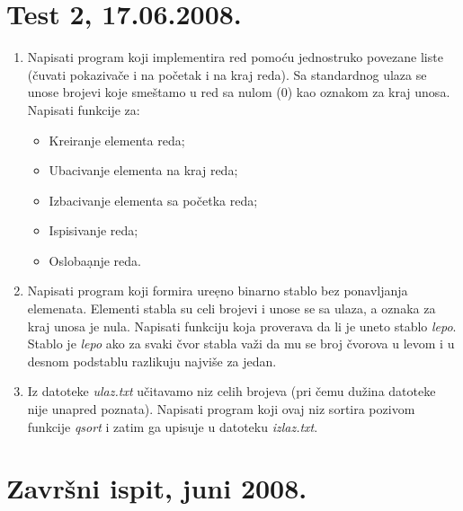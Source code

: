 \section{Test 2, 17.06.2008.}


\begin{enumerate}
\item
Napisati program koji implementira red pomo\' cu jednostruko
povezane liste (\v cuvati pokaziva\v ce i na po\v cetak i na kraj
reda).
Sa standardnog ulaza se unose brojevi koje sme\v stamo u red sa
nulom ($0$) kao oznakom za kraj unosa.
Napisati funkcije za:

\begin{itemize}
\item Kreiranje elementa reda;
\item Ubacivanje elementa na kraj reda;
\item Izbacivanje elementa sa po\v cetka reda;
\item Ispisivanje reda;
\item Osloba\d anje reda.
\end{itemize}


\item
Napisati program koji formira ure\d eno binarno stablo bez ponavljanja
elemenata. Elementi stabla su celi brojevi i unose se sa ulaza, a oznaka
za kraj unosa je nula. Napisati funkciju koja proverava da li je uneto
stablo \emph{lepo}. Stablo je \emph{lepo} ako za svaki \v cvor
stabla va\v zi da mu se broj \v cvorova u levom i u desnom podstablu
razlikuju najvi\v se za jedan.

\item
Iz datoteke \emph{ulaz.txt} u\v citavamo niz celih brojeva (pri \v cemu
du\v zina datoteke nije unapred poznata). Napisati program koji
ovaj niz sortira pozivom funkcije \emph{qsort} i zatim ga
upisuje u datoteku \emph{izlaz.txt}.
\end{enumerate}


\section{Zavr\v{s}ni ispit, juni 2008.}



